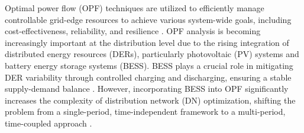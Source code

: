 \documentclass{article}
\begin{document}

Optimal power flow (OPF) techniques are utilized to efficiently manage controllable grid-edge resources to achieve various system-wide goals, including cost-effectiveness, reliability, and resilience \cite{EES-030}. OPF analysis is becoming increasingly important at the distribution level due to the rising integration of distributed energy resources (DERs), particularly photovoltaic (PV) systems and battery energy storage systems (BESS). BESS plays a crucial role in mitigating DER variability through controlled charging and discharging, ensuring a stable supply-demand balance \cite{tgangwar}. However, incorporating BESS into OPF significantly increases the complexity of distribution network (DN) optimization, shifting the problem from a single-period, time-independent framework to a multi-period, time-coupled approach \cite{Paul}.
\end{document}

